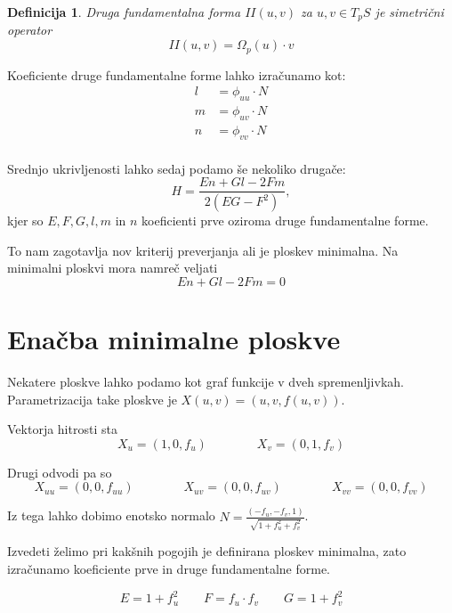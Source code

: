 \documentclass{article}
\newtheorem{definicija}{Definicija}
\begin{document}
    \begin{definicija}
        \emph{Druga fundamentalna forma $II(u, v)$} za $u, v \in T_p S$ je simetrični operator $$II(u, v) = \Omega_p(u) \cdot v$$
    \end{definicija}

    Koeficiente druge fundamentalne forme lahko izračunamo kot:
    \begin{align*}
        l &= \phi_{uu} \cdot N \\
        m &= \phi_{uv} \cdot N \\
        n &= \phi_{vv} \cdot N \\
    \end{align*}

    Srednjo ukrivljenosti lahko sedaj podamo še nekoliko drugače:
    $$ H = \frac{En + Gl - 2Fm}{2(EG - F^2)}, $$
    kjer so $E, F, G, l, m \text{ in } n$ koeficienti prve oziroma druge fundamentalne forme.

    To nam zagotavlja nov kriterij preverjanja ali je ploskev minimalna. Na minimalni ploskvi mora namreč veljati 
    \begin{equation} \label{eq:1}
        En + Gl - 2Fm = 0
    \end{equation}


    \section{Enačba minimalne ploskve}

    Nekatere ploskve lahko podamo kot graf funkcije v dveh spremenljivkah.
    Parametrizacija take ploskve je $X (u, v) = (u, v, f (u, v))$.

    Vektorja hitrosti sta
    $$ X_u = (1, 0, f_u) \qquad \qquad X_v = (0, 1, f_v)  $$ 

    Drugi odvodi pa so
    $$
        X_{uu} = (0, 0, f_{uu}) \qquad \qquad
        X_{uv} = (0, 0, f_{uv}) \qquad \qquad
        X_{vv} = (0, 0, f_{vv})
    $$

    Iz tega lahko dobimo enotsko normalo $N = \frac{(- f_u, - f_v, 1)}{\sqrt{1 + f_u^2 + f_v^2}}$.

    Izvedeti želimo pri kakšnih pogojih je definirana ploskev minimalna, zato izračunamo koeficiente prve in druge fundamentalne forme.

    $$ E = 1 + f_u^2 \qquad 
    F = f_u \cdot f_v \qquad 
    G = 1 + f_v^2 $$
\end{document}
